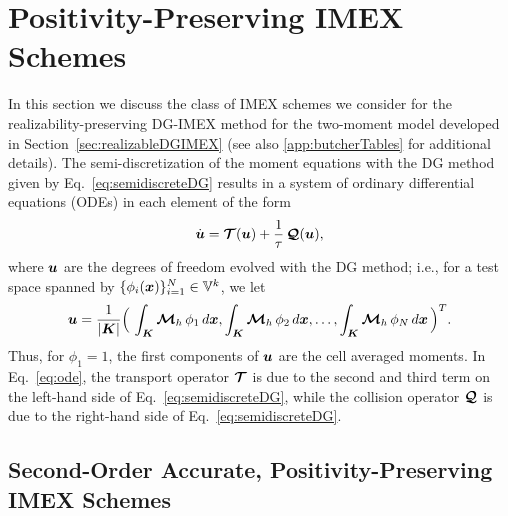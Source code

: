 \section{Positivity-Preserving IMEX Schemes}
\label{sec:imex}

In this section we discuss the class of IMEX schemes we consider for the realizability-preserving DG-IMEX method for the two-moment model developed in Section~\ref{sec:realizableDGIMEX} (see also \ref{app:butcherTables} for additional details).  
The semi-discretization of the moment equations with the DG method given by Eq.~\eqref{eq:semidiscreteDG} results in a system of ordinary differential equations (ODEs) in each element of the form
\begin{equation}
  \dot{\boldsymbol{u}}
  =\boldsymbol{\mathcal{T}}(\boldsymbol{u})+\frac{1}{\tau}\,\boldsymbol{\mathcal{Q}}(\boldsymbol{u}),
  \label{eq:ode}
\end{equation}
where $\boldsymbol{u}$ are the degrees of freedom evolved with the DG method; i.e., for a test space spanned by $\{\phi_{i}(\boldsymbol{x})\}_{i=1}^{N}\in\mathbb{V}^{k}$, we let
\begin{equation}
  \boldsymbol{u}=\frac{1}{|\boldsymbol{K}|}\Big(\,\int_{\boldsymbol{K}}\boldsymbol{\mathcal{M}}_{h}\,\phi_{1}\,d\boldsymbol{x},\int_{\boldsymbol{K}}\boldsymbol{\mathcal{M}}_{h}\,\phi_{2}\,d\boldsymbol{x},\ldots,\int_{\boldsymbol{K}}\boldsymbol{\mathcal{M}}_{h}\,\phi_{N}\,d\boldsymbol{x}\,\Big)^{T}.
\end{equation}
Thus, for $\phi_{1}=1$, the first components of $\boldsymbol{u}$ are the cell averaged moments.  
In Eq.~\eqref{eq:ode}, the transport operator $\boldsymbol{\mathcal{T}}$ is due to the second and third term on the left-hand side of Eq.~\eqref{eq:semidiscreteDG}, while the collision operator $\boldsymbol{\mathcal{Q}}$ is due to the right-hand side of Eq.~\eqref{eq:semidiscreteDG}.  

\subsection{Second-Order Accurate, Positivity-Preserving IMEX Schemes}


